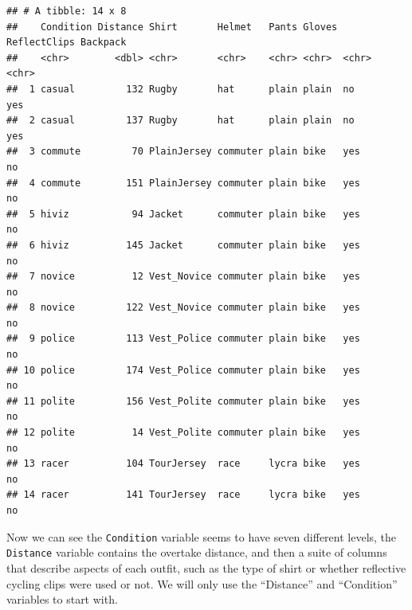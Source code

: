 \documentclass[
]{book}
\begin{document}
\begin{verbatim}
## # A tibble: 14 x 8
##    Condition Distance Shirt       Helmet   Pants Gloves ReflectClips Backpack
##    <chr>        <dbl> <chr>       <chr>    <chr> <chr>  <chr>        <chr>   
##  1 casual         132 Rugby       hat      plain plain  no           yes     
##  2 casual         137 Rugby       hat      plain plain  no           yes     
##  3 commute         70 PlainJersey commuter plain bike   yes          no      
##  4 commute        151 PlainJersey commuter plain bike   yes          no      
##  5 hiviz           94 Jacket      commuter plain bike   yes          no      
##  6 hiviz          145 Jacket      commuter plain bike   yes          no      
##  7 novice          12 Vest_Novice commuter plain bike   yes          no      
##  8 novice         122 Vest_Novice commuter plain bike   yes          no      
##  9 police         113 Vest_Police commuter plain bike   yes          no      
## 10 police         174 Vest_Police commuter plain bike   yes          no      
## 11 polite         156 Vest_Polite commuter plain bike   yes          no      
## 12 polite          14 Vest_Polite commuter plain bike   yes          no      
## 13 racer          104 TourJersey  race     lycra bike   yes          no      
## 14 racer          141 TourJersey  race     lycra bike   yes          no
\end{verbatim}

Now we can see the \texttt{Condition} variable seems to have seven different levels, the \texttt{Distance} variable contains the overtake distance, and then a suite of columns that describe aspects of each outfit, such as the type of shirt or whether reflective cycling clips were used or not. We will only use the ``Distance'' and ``Condition'' variables to start with.
\end{document}
